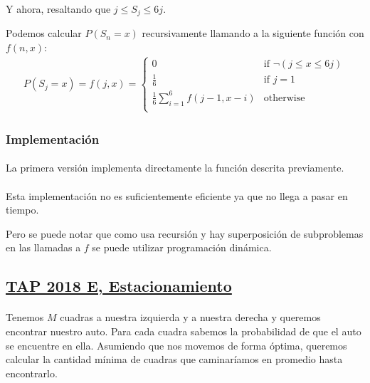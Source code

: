 \documentclass[../main.tex]{subfiles}
\begin{document}
Y ahora, resaltando que \(j \leq S_{j} \leq 6j\).

Podemos calcular \(P(S_{n} = x)\) recursivamente llamando a la siguiente función con \(f(n, x)\):
\begin{gather*}
  P(S_{j} = x) = f(j, x) = \begin{cases}
    0 & \text{if } \neg(j \leq x \leq 6j) \\
    \frac{1}{6} & \text{if } j = 1 \\
    \frac{1}{6}\sum_{i = 1}^{6}f(j-1, x-i) & \text{otherwise} \\
  \end{cases}
\end{gather*}

\subsubsection{Implementación}

\paragraph{} La primera versión implementa directamente la función descrita previamente.


\paragraph{} Esta implementación no es suficientemente eficiente ya que no llega a pasar en tiempo.

Pero se puede notar que como usa recursión y hay superposición de subproblemas en las llamadas a \(f\) se puede utilizar programación dinámica.


\subsection{\href{https://codeforces.com/group/YjFmW2O15Q/contest/101919}{TAP 2018 E, Estacionamiento}}

\paragraph{} Tenemos \(M\) cuadras a nuestra izquierda y a nuestra derecha y queremos encontrar nuestro auto. Para cada cuadra sabemos la probabilidad de que el auto se encuentre en ella. Asumiendo que nos movemos de forma óptima, queremos calcular la cantidad mínima de cuadras que caminaríamos en promedio hasta encontrarlo.
\end{document}
